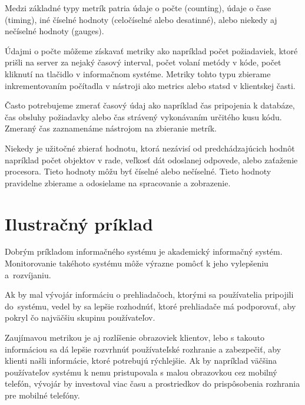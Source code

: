 \documentclass[a4paper, upjsfrontpage, disablespecwarning, thesismargins, thesislinespacing]{rnthesis}
\begin{document}
Medzi základné typy metrík patria údaje o počte (counting), údaje o čase (timing), iné číselné hodnoty (celočíselné alebo desatinné), alebo niekedy aj nečíselné hodnoty (gauges). 

Údajmi o počte môžeme získavať metriky ako napríklad počet požiadaviek, ktoré prišli na server za nejaký časový interval, počet volaní metódy v kóde, počet kliknutí na tlačidlo v informačnom systéme. Metriky tohto typu zbierame inkrementovaním počítadla v nástroji ako metrics alebo statsd v klientskej časti.

Často potrebujeme zmerať časový údaj ako napríklad čas pripojenia k databáze, čas obsluhy požiadavky alebo čas strávený vykonávaním určitého kusu kódu. Zmeraný čas zaznamenáme nástrojom na zbieranie metrík.

Niekedy je užitočné zbierať hodnotu, ktorá nezávisí od predchádzajúcich hodnôt napríklad počet objektov v rade, veľkosť dát odoslanej odpovede, alebo zaťaženie procesora. 
Tieto hodnoty môžu byť číselné alebo nečíselné. Tieto hodnoty pravidelne zbierame a odosielame na spracovanie a zobrazenie.


\section{Ilustračný príklad}

Dobrým príkladom informačného systému je akademický informačný systém.
Monitorovanie takéhoto systému môže výrazne pomôcť k jeho vylepšeniu a~rozví\-janiu.

Ak by mal vývojár informáciu o prehliadačoch, ktorými sa používatelia pripojili do~systému, vedel by sa lepšie rozhodnúť, ktoré prehliadače má podporovať, aby pokryl čo najväčšiu skupinu používateľov.

Zaujímavou metrikou je aj rozlíšenie obrazoviek klientov, lebo s takouto informáciou sa dá lepšie rozvrhnúť používateľské rozhranie a zabezpečiť, aby klienti našli informácie, ktoré potrebujú rýchlejšie.
Ak by napríklad väčšina používateľov systému k nemu pristupovala s malou obrazovkou cez mobilný telefón, vývojár by investoval viac času a prostriedkov do prispôsobenia rozhrania pre mobilné telefóny.
\end{document}
